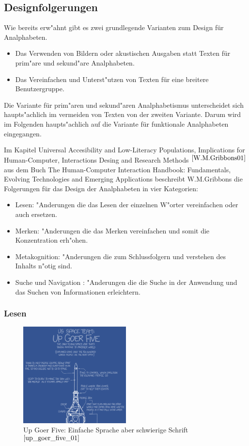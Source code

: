 \subsection{ Designfolgerungen}\label{sec:designClue}
Wie bereits erw"ahnt gibt es zwei grundlegende Varianten zum Design für Analphabeten.
\begin{itemize}
\item Das Verwenden von Bildern oder akustischen Ausgaben statt Texten für prim"are und sekund"are Analphabeten.
\item Das Vereinfachen und Unterst"utzen von Texten für eine breitere Benutzergruppe.
\end{itemize}
Die Variante für prim"aren und sekund"aren Analphabetismus unterscheidet sich haupts"achlich im vermeiden von Texten von der zweiten Variante. Darum wird im Folgenden haupts"achlich auf die Variante für funktionale Analphabeten eingegangen.

Im Kapitel \glqq Universal Accesibility and Low-Literacy Populations, Implications for Human-Computer, Interactions Desing and Research Methods \grqq$^{\ref{W.M.Gribbons01}}$ aus dem Buch \glqq The Human-Computer Interaction Handbook: Fundamentals, Evolving Technologies and Emerging Applications \grqq beschreibt W.M.Gribbons die Folgerungen für das Design der Analphabeten in vier Kategorien:\\

\begin{itemize}
\item Lesen:              "Anderungen die das Lesen der einzelnen W"orter vereinfachen oder auch ersetzen.
\item Merken:            "Anderungen die das Merken vereinfachen und somit die Konzentration erh"ohen.
\item Metakognition: "Anderungen die zum Schlussfolgern und verstehen des Inhalts n"otig sind.
\item Suche und Navigation : "Anderungen die die Suche in der Anwendung und das Suchen von Informationen erleichtern.
\end{itemize}

\subsubsection{Lesen}\label{sec:designClueReading}
\begin{figure}[h]
	\centering
		\includegraphics[width=0.50\textwidth]{Daten/up_goer_five_part.png}
	\caption{Up Goer Five: Einfache Sprache aber schwierige Schrift $^{\ref{up_goer_five_01}}$}
	\label{fig:GoerFive}
\end{figure}

